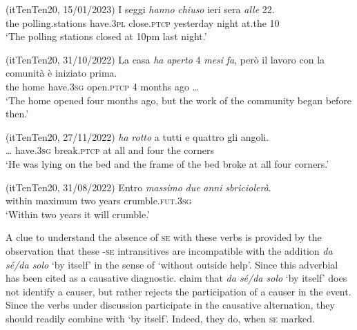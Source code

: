\documentclass[output=paper,colorlinks,citecolor=brown
]{langscibook}
\begin{document}
\hspace*{\fill}(itTenTen20, 15/01/2023)\quad
\ea \label{bentley_example_29}
    \gll I			seggi										\textit{hanno}			\textit{chiuso} 				ieri 						sera 		\textit{alle}		22. \\
    the	polling.stations	have.3\textsc{pl}	close.\textsc{ptcp}		yesterday	night	at.the	10 \\
    \glt 	‘The polling stations closed at 10pm last night.’
\z

\hspace*{\fill}(itTenTen20, 31/10/2022)\quad
\ea \label{bentley_example_30}
    \gll La		casa			\textit{ha}						\textit{aperto}				4	\textit{mesi}				\textit{fa}, {però il lavoro con la comunità è iniziato prima.}\\
    			the		home		have.3\textsc{sg}	open.\textsc{ptcp}	4	months	ago {\ldots} \\
    \glt 				‘The home opened four months ago, but the work of the community began before then.’
\z

\hspace*{\fill}(itTenTen20, 27/11/2022)\quad
\ea \label{bentley_example_31}
     \textit{ha}						\textit{rotto}						a		tutti	e				quattro 	gli 	angoli.  \\
    	{\ldots} 	have.3\textsc{sg}	break.\textsc{ptcp}	at	all		and	four				the	corners\\
    \glt 				‘He was lying on the bed and the frame of the bed broke at all four corners.’
\z

\hspace*{\fill}(itTenTen20, 31/08/2022)\quad
\ea \label{bentley_example_32}
    \gll Entro		\textit{massimo}			\textit{due}	\textit{anni}		\textit{sbriciolerà}. \\
    	within	maximum		two	years	crumble.\textsc{fut}.3\textsc{sg} \\
    \glt 				‘Within two years it will crumble.’
\z

A clue to understand the absence of \textsc{se} with these verbs is provided by the observation that these -\textsc{se} intransitives are incompatible with the addition \textit{da sé/da solo} ‘by itself’ in the sense of ‘without outside help’. Since \citet{chierchia1989semantics} this adverbial has been cited as a causative diagnostic. \citet[76—79]{alexiadou2015external}  claim that\textit{ da sé/da solo} ‘by itself’ does not identify a causer, but rather rejects the participation of a causer in the event. Since the verbs under discussion participate in the causative alternation, they should readily combine with ‘by itself’. Indeed, they do, when \textsc{se} marked.
\end{document}
